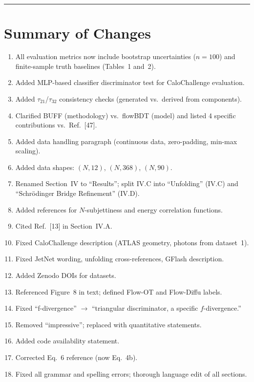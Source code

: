 \documentclass[11pt]{article}
\begin{document}
\bigskip
\hrule
\bigskip

\section*{Summary of Changes}

\begin{enumerate}
    \item All evaluation metrics now include bootstrap uncertainties ($n=100$) and finite-sample truth baselines (Tables~1 and~2).
    \item Added MLP-based classifier discriminator test for CaloChallenge evaluation.
    \item Added $\tau_{21}$/$\tau_{32}$ consistency checks (generated vs.\ derived from components).
    \item Clarified BUFF (methodology) vs.\ flowBDT (model) and listed 4 specific contributions vs.\ Ref.~[47].
    \item Added data handling paragraph (continuous data, zero-padding, min-max scaling).
    \item Added data shapes: $(N, 12)$, $(N, 368)$, $(N, 90)$.
    \item Renamed Section~IV to ``Results''; split IV.C into ``Unfolding'' (IV.C) and ``Schr\"odinger Bridge Refinement'' (IV.D).
    \item Added references for $N$-subjettiness and energy correlation functions.
    \item Cited Ref.~[13] in Section~IV.A.
    \item Fixed CaloChallenge description (ATLAS geometry, photons from dataset~1).
    \item Fixed JetNet wording, unfolding cross-references, GFlash description.
    \item Added Zenodo DOIs for datasets.
    \item Referenced Figure~8 in text; defined Flow-OT and Flow-Diffu labels.
    \item Fixed ``f-divergence'' $\to$ ``triangular discriminator, a specific $f$-divergence.''
    \item Removed ``impressive''; replaced with quantitative statements.
    \item Added code availability statement.
    \item Corrected Eq.~6 reference (now Eq.~4b).
    \item Fixed all grammar and spelling errors; thorough language edit of all sections.
\end{enumerate}
\end{document}
